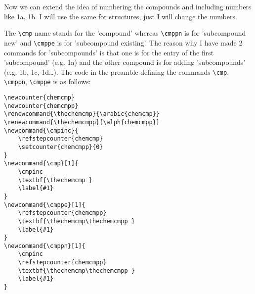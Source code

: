 Now we can extend the idea of numbering the compounds and including numbers like
1a, 1b. I will use the same for structures, just I will change the numbers.




The \verb|\cmp| name stands for the 'compound'
whereas \verb|\cmppn| is for 'subcompound new' and \verb|\cmppe| is for
'subcompound existing'. The reason why I have made 2 commands for 'subcompounds'
is that one is for the entry of the first 'subcompound' (e.g. 1a) and the other
compound is for adding 'subcompounds' (e.g. 1b, 1c, 1d\ldots).
The code in the preamble defining the commands \verb|\cmp|, \verb|\cmppn|,
\verb|\cmppe| is as follows:
\begin{lstlisting}
\newcounter{chemcmp}
\newcounter{chemcmpp}
\renewcommand{\thechemcmp}{\arabic{chemcmp}}
\renewcommand{\thechemcmpp}{\alph{chemcmpp}}
\newcommand{\cmpinc}{
    \refstepcounter{chemcmp}
    \setcounter{chemcmpp}{0}
}
\newcommand{\cmp}[1]{
    \cmpinc
    \textbf{\thechemcmp }
    \label{#1}
}
\newcommand{\cmppe}[1]{
    \refstepcounter{chemcmpp}
    \textbf{\thechemcmp\thechemcmpp }
    \label{#1}
}
\newcommand{\cmppn}[1]{
    \cmpinc
    \refstepcounter{chemcmpp}
    \textbf{\thechemcmp\thechemcmpp }
    \label{#1}
}
\end{lstlisting}





